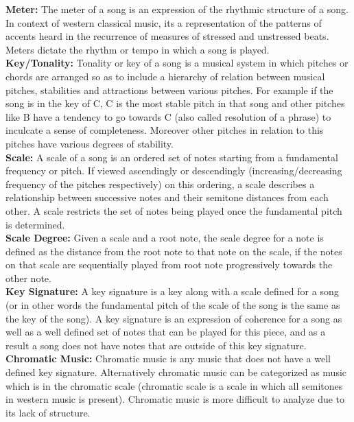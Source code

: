 \noindent \textbf{Meter:} The meter of a song is an expression of the rhythmic structure of a song. In context of western classical music, its a representation of the patterns of accents heard in the recurrence of measures of stressed and unstressed beats. Meters dictate the rhythm or tempo in which a song is played. \\

\noindent \textbf{Key/Tonality:} Tonality or key of a song is a musical system in which pitches or chords are arranged so as to include a hierarchy of relation between musical pitches, stabilities and attractions between various pitches. For example if the song is in the key of C, C is the most stable pitch in that song and other pitches like B have a tendency to go towards C (also called resolution of a phrase) to inculcate a sense of completeness. Moreover other pitches in relation to this pitches have various degrees of stability. \\

\noindent \textbf{Scale:} A scale of a song is an ordered set of notes starting from a fundamental frequency or pitch. If viewed ascendingly or descendingly (increasing/decreasing frequency of the pitches respectively) on this ordering, a scale describes a relationship between successive notes and their semitone distances from each other. A scale restricts the set of notes being played once the fundamental pitch is determined. \\

\noindent \textbf{Scale Degree:} Given a scale and a root note, the scale degree for a note is defined as the distance from the root note to that note on the scale, if the notes on that scale are sequentially played from root note progressively towards the other note. \\

\noindent \textbf{Key Signature:} A key signature is a key along with a scale defined for a song (or in other words the fundamental pitch of the scale of the song is the same as the key of the song). A key signature is an expression of coherence for a song as well as a well defined set of notes that can be played for this piece, and as a result a song does not have notes that are outside of this key signature. \\

\noindent \textbf{Chromatic Music:} Chromatic music is any music that does not have a well defined key signature. Alternatively chromatic music can be categorized as music which is in the chromatic scale (chromatic scale is a scale in which all semitones in western music is present). Chromatic music is more difficult to analyze due to its lack of structure. \\

